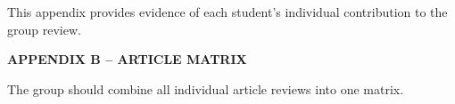 \documentclass[12pt,a4paper]{article}
\begin{document}
\noindent This appendix provides evidence of each student's individual contribution to the group review.




\newpage

{}

\begin{flushleft}
    {\fontsize{14pt}{17pt}\selectfont
    \textbf{APPENDIX B -- ARTICLE MATRIX}}
\end{flushleft}

\vspace{0.5cm}

The group should combine all individual article reviews into one matrix.


\vspace{0.5cm}


















\end{document}
